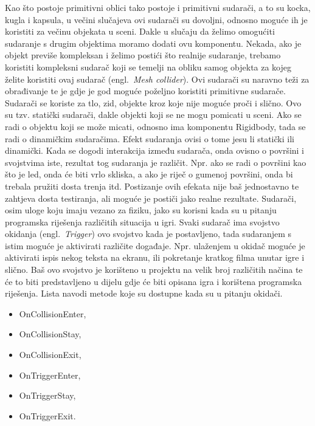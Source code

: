 Kao što postoje primitivni oblici tako postoje i primitivni sudarači, a to su kocka, kugla i kapsula, u večini slučajeva ovi sudarači su dovoljni, odnosno moguće ih je koristiti za večinu objekata u sceni. Dakle u slučaju da želimo omogućiti sudaranje s drugim objektima moramo dodati ovu komponentu. Nekada, ako je objekt previše kompleksan i želimo postići što realnije sudaranje, trebamo koristiti kompleksni sudarač koji se temelji na obliku samog objekta za kojeg želite koristiti ovaj sudarač (engl.~\textit{Mesh collider}). Ovi sudarači su naravno teži za obrađivanje te je gdje je god moguće poželjno koristiti primitivne sudarače.
Sudarači se koriste za tlo, zid, objekte kroz koje nije moguće proči i slično. Ovo su tzv. statički sudarači, dakle objekti koji se ne mogu pomicati u sceni. Ako se radi o objektu koji se može micati, odnosno ima komponentu Rigidbody, tada se radi o dinamičkim sudaračima. Efekt sudaranja ovisi o tome jesu li statički ili dinamički.
Kada se dogodi interakcija između sudarača, onda ovisno o površini i svojstvima iste, rezultat tog sudaranja je različit. Npr. ako se radi o površini kao što je led, onda će biti vrlo skliska, a ako je riječ o gumenoj površini, onda bi trebala pružiti dosta trenja itd. Postizanje ovih efekata nije baš jednostavno te zahtjeva dosta testiranja, ali moguće je postiči jako realne rezultate. 
Sudarači, osim uloge koju imaju vezano za fiziku, jako su korisni kada su u pitanju programska riješenja različitih situacija u igri. Svaki sudarač ima svojstvo okidanja (engl.~\textit{Trigger}) ovo svojstvo kada je postavljeno, tada sudaranjem s istim moguće je aktivirati različite događaje. Npr. ulaženjem u okidač moguće je aktivirati ispis nekog teksta na ekranu, ili pokretanje kratkog filma unutar igre i slično. Baš ovo svojstvo je korišteno u projektu na velik broj različitih načina te će to biti predstavljeno u dijelu gdje će biti opisana igra i korištena programska riješenja.
Lista navodi metode koje su dostupne kada su u pitanju okidači.
\begin{itemize}
  \item OnCollisionEnter,
  \item OnCollisionStay,
  \item OnCollisionExit,
  \item OnTriggerEnter,
  \item OnTriggerStay,
  \item OnTriggerExit.
\end{itemize}

